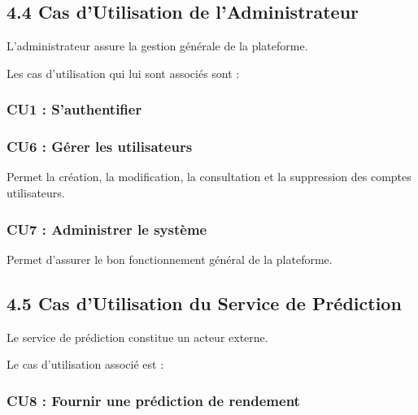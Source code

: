 \documentclass[
]{article}
\begin{document}
\hypertarget{cas-dutilisation-de-ladministrateur}{%
\subsection{4.4 Cas d'Utilisation de
l'Administrateur}\label{cas-dutilisation-de-ladministrateur}}

L'administrateur assure la gestion générale de la plateforme.

Les cas d'utilisation qui lui sont associés sont :

\hypertarget{cu1-sauthentifier-2}{%
\subsubsection{CU1 : S'authentifier}\label{cu1-sauthentifier-2}}

\hypertarget{cu6-guxe9rer-les-utilisateurs}{%
\subsubsection{CU6 : Gérer les
utilisateurs}\label{cu6-guxe9rer-les-utilisateurs}}

Permet la création, la modification, la consultation et la suppression
des comptes utilisateurs.

\hypertarget{cu7-administrer-le-systuxe8me}{%
\subsubsection{CU7 : Administrer le
système}\label{cu7-administrer-le-systuxe8me}}

Permet d'assurer le bon fonctionnement général de la plateforme.

\hypertarget{cas-dutilisation-du-service-de-pruxe9diction}{%
\subsection{4.5 Cas d'Utilisation du Service de
Prédiction}\label{cas-dutilisation-du-service-de-pruxe9diction}}

Le service de prédiction constitue un acteur externe.

Le cas d'utilisation associé est :

\hypertarget{cu8-fournir-une-pruxe9diction-de-rendement}{%
\subsubsection{CU8 : Fournir une prédiction de
rendement}\label{cu8-fournir-une-pruxe9diction-de-rendement}}
\end{document}
